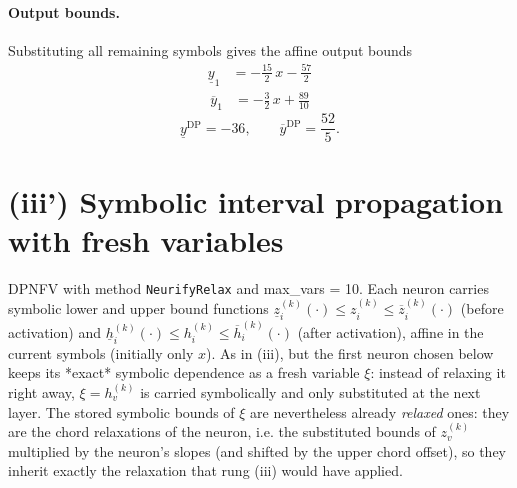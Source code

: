 \documentclass[11pt]{article}
\begin{document}
\paragraph{Output bounds.}
Substituting all remaining symbols gives the affine output bounds
\begin{align*}
\underline{y}_{1} &= -\frac{15}{2}\,x - \frac{57}{2}
\end{align*}
\begin{align*}
\overline{y}_{1} &= -\frac{3}{2}\,x + \frac{89}{10}
\end{align*}
\begin{equation*}
\underline{y}^{\text{DP}} = -36, \qquad \overline{y}^{\text{DP}} = \frac{52}{5}.
\end{equation*}

\section{(iii') Symbolic interval propagation with fresh variables}
DPNFV with method \texttt{NeurifyRelax} and max\_vars = 10. Each neuron carries symbolic lower and upper bound functions
$\underline{z}^{(k)}_i(\cdot) \le z^{(k)}_i \le \overline{z}^{(k)}_i(\cdot)$ (before activation)
and $\underline{h}^{(k)}_i(\cdot) \le h^{(k)}_i \le \overline{h}^{(k)}_i(\cdot)$ (after activation),
affine in the current symbols (initially only $x$).
As in (iii), but the first neuron chosen below keeps its *exact*
symbolic dependence as a fresh variable $\xi$: instead of relaxing it right away, $\xi = h^{(k)}_v$
is carried symbolically and only substituted at the next layer. The stored symbolic bounds of $\xi$
are nevertheless already \emph{relaxed} ones: they are the chord relaxations of the neuron, i.e.
the substituted bounds of $z^{(k)}_v$ multiplied by the neuron's slopes (and shifted by the upper
chord offset), so they inherit exactly the relaxation that rung (iii) would have applied.
\end{document}
